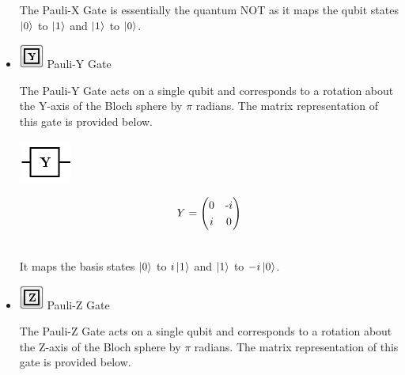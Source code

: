 \documentclass[10pt]{article}
\theoremstyle{definition}
\newcommand{\microspace}{\mspace{0.5mu}}
\def \lket {\left|}
\def \rket {\right\rangle}
\newcommand{\ket}[1]{\lket\microspace #1 \microspace\rket}
\begin{document}
\begin{itemize}
The Pauli-X Gate is essentially the quantum NOT as it maps the qubit states $\ket{0}$ to $\ket{1}$ and $\ket{1}$ to $\ket{0}$. 

\item \includegraphics{Figures/Gates/YGate.png}  Pauli-Y Gate

The Pauli-Y Gate acts on a single qubit and corresponds to a rotation about the Y-axis of the Bloch sphere by $\pi$ radians. The matrix representation of this gate is provided below. 

\begin{center}
\includegraphics[scale=.7]{Figures/Gates/YGateViewer} \\
  \begin{minipage}{.9\linewidth}
    \begin{equation*} \label{mat:YGate}
    \renewcommand{\arraystretch}{1.25}
Y = \begin{pmatrix} 0 & \textnormal{-}i \\ i & 0 \end{pmatrix}
    \end{equation*}
  \end{minipage}\hspace{-2.5cm}
  \begin{minipage}{.2\linewidth}
  \vspace*{3pt}
    \begin{align}
    \end{align}
  \end{minipage}
\end{center}

It maps the basis states $\ket{0}$ to $i\ket{1}$ and $\ket{1}$ to $-i\ket{0}$. 

\item \includegraphics{Figures/Gates/ZGate.png}  Pauli-Z Gate

The Pauli-Z Gate acts on a single qubit and corresponds to a rotation about the Z-axis of the Bloch sphere by $\pi$ radians. The matrix representation of this gate is provided below.


\end{itemize}
\end{document}
